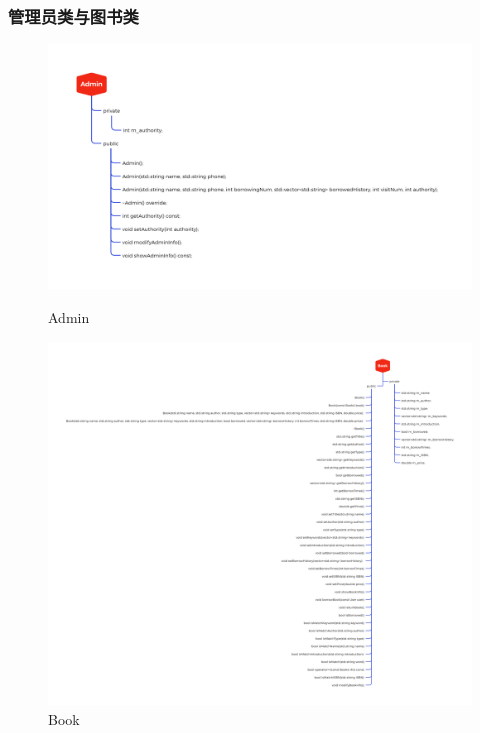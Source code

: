 \documentclass[12pt,twoside]{ctexart}
\begin{document}
\subsubsection{管理员类与图书类}
\begin{figure}[H]
    \centering
    \begin{minipage}{0.45\textwidth}
        \centering
        \includegraphics[width=\textwidth]{Pic/LibraryManagement/Admin.png}
        \caption{Admin}
    \end{minipage}\hfill
    \begin{minipage}{0.45\textwidth}
        \centering
        \includegraphics[width=\textwidth]{Pic/LibraryManagement/Book.png}
        \caption{Book}
    \end{minipage}
\end{figure}
\end{document}
